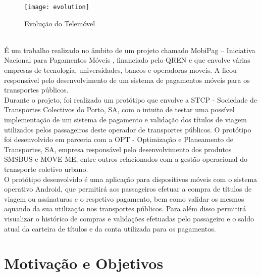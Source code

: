 \begin{figure}[t]
  \begin{center}
    \leavevmode
    \texttt{[image: evolution]}
    \caption{Evolução do Telemóvel}
    \label{fig:evolution}
  \end{center}
\end{figure}

~\\É um trabalho realizado no âmbito de um projeto chamado MobiPag – Iniciativa Nacional para Pagamentos Móveis \cite{cedt}, financiado pelo QREN e que envolve várias empresas de tecnologia, universidades, bancos e operadoras moveis. A \Feup ficou responsável pelo desenvolvimento de um sistema de pagamentos móveis para os transportes públicos.
\\Durante o projeto, foi realizado um protótipo que envolve a STCP - Sociedade de Transportes Colectivos do Porto, SA, com o intuito de testar uma possível implementação de um sistema de pagamento e validação dos títulos de viagem utilizados pelos passageiros deste operador de transportes públicos. O protótipo foi desenvolvido em parceria com a OPT -  Optimização e Planeamento de Transportes, SA, empresa responsável pelo desenvolvimento dos produtos SMSBUS e MOVE-ME, entre outros relacionados com a gestão operacional do transporte coletivo urbano. \cite{OPT}
\\O protótipo desenvolvido é uma aplicação para dispositivos móveis com o sistema operativo Android, que permitirá aos passageiros efetuar a compra de títulos de viagem ou assinaturas e o respetivo pagamento, bem como validar os mesmos aquando da sua utilização nos transportes públicos. Para além disso permitirá visualizar o histórico de compras e validações efetuadas pelo passageiro e o saldo atual da carteira de títulos e da conta utilizada para os pagamentos.

\section{Motivação e Objetivos} \label{sec:goals}

